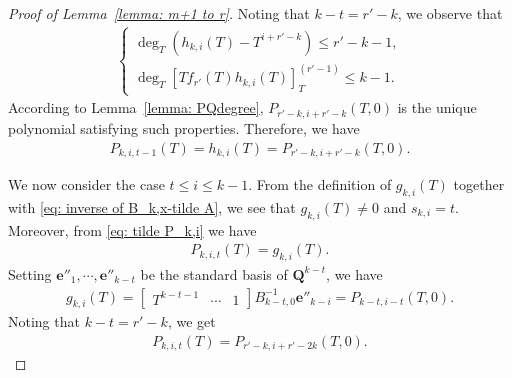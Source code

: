 \documentclass[11pt]{amsart}
\theoremstyle{definition}
\numberwithin{equation}{subsection}
\theoremstyle{plain}
\theoremstyle{plain}
\theoremstyle{plain}
\theoremstyle{plain}
\theoremstyle{plain}
\theoremstyle{plain}
\theoremstyle{plain}
\theoremstyle{plain}
\theoremstyle{plain}
\theoremstyle{plain}
\theoremstyle{plain}
\theoremstyle{plain}
\theoremstyle{definition}
\theoremstyle{definition}
\theoremstyle{definition}
\theoremstyle{remark}
\renewcommand{\(}{\textup{(}}
\renewcommand{\)}{\textup{)}}
\newcommand{\Q}{\mathbf{Q}}
\begin{document}
\begin{proof}[Proof of Lemma~\ref{lemma: m+1 to r}]
Noting that $k-t=r'-k$, we observe that
    \begin{align*}
        \begin{cases}
            \deg_T (h_{k,i}(T)-T^{i+r'-k})\leq r'-k-1,\\
            \deg_T [Tf_{r'}(T)h_{k,i}(T)]_{T}^{(r'-1)} \leq k-1.
        \end{cases}
    \end{align*}
According to Lemma~\ref{lemma: PQdegree}, $P_{r'-k,i+r'-k}(T,0)$ is the unique polynomial satisfying such properties.
Therefore, we have
    \begin{align*}
        P_{k,i,t-1}(T)
        =h_{k,i}(T)
        =P_{r'-k,i+r'-k}(T,0).
    \end{align*}



We now consider the case $t\leq i\leq k-1$. From the definition of $g_{k,i}(T)$ together with \eqref{eq: inverse of B_k,x-tilde A}, we see that $g_{k,i}(T)\neq 0$ and $s_{k,i}=t$. Moreover, from \eqref{eq: tilde P_k,i} we have
    \begin{align*}
        P_{k,i,t}(T) =g_{k,i}(T).
    \end{align*}
Setting $\mathbf{e}''_1,\cdots,\mathbf{e}''_{k-t}$ be the standard basis of $\Q^{k-t}$, we have
    \begin{align*}
        g_{k,i}(T)
        =
        \begin{bmatrix}
            T^{k-t-1} & \cdots & 1
        \end{bmatrix}
        B_{k-t,0}^{-1}
        \mathbf{e}''_{k-i}=P_{k-t,i-t}(T,0).
    \end{align*}
Noting that $k-t=r'-k$, we get
    \begin{align*}
        P_{k,i,t}(T)=P_{r'-k,i+r'-2k}(T,0).
    \end{align*}



\end{proof}
\end{document}
